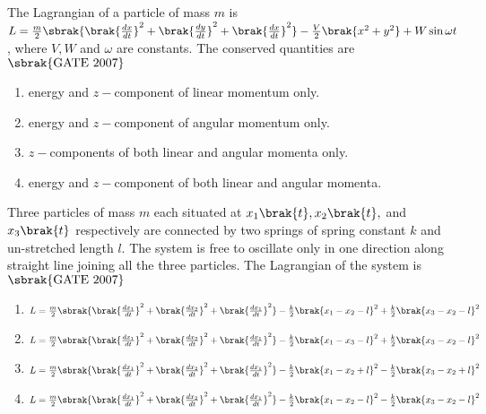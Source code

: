 \iffalse
\section{ph}
\chapter{2007}
\author{ee24btech11017}
\fi

    \item The Lagrangian of a particle of mass $m$ is $L = \frac{m}{2}\sbrak{\brak{\frac{dx}{dt}}^2 +\brak{\frac{dy}{dt}}^2 +\brak{\frac{dx}{dt}}^2}-\frac{V}{2}\brak{x^2+y^2}+W\sin{\omega t}$, where $V,W$ and $\omega$ are constants. The conserved quantities are\hfill{$\sbrak{\text{GATE 2007}}$} \begin{enumerate}
    \item energy and $z-$component of linear momentum only.
    \item energy and $z-$component of angular momentum only. 
    \item $z-$components of both linear and angular momenta only.
    \item energy and $z-$component of both linear and angular momenta.
\end{enumerate}
\item Three particles of mass $m$ each situated at $x_1\brak{t}, x_2\brak{t},$ and $x_3\brak{t}$ respectively are connected by two springs of spring constant $k$ and un-stretched length $l$. The system is free to oscillate only in one direction along straight line joining all the three particles. The Lagrangian of the system is \hfill{$\sbrak{\text{GATE 2007}}$} 
\begin{enumerate}
    \item $L = \frac{m}{2}\sbrak{\brak{\frac{dx_1}{dt}}^2 +\brak{\frac{dx_2}{dt}}^2 +\brak{\frac{dx_1}{dt}}^2}-\frac{k}{2}\brak{x_1-x_2-l}^2 + \frac{k}{2}\brak{x_3 - x_2 - l}^2$
     \item $L = \frac{m}{2}\sbrak{\brak{\frac{dx_1}{dt}}^2 +\brak{\frac{dx_2}{dt}}^2 +\brak{\frac{dx_1}{dt}}^2}-\frac{k}{2}\brak{x_1-x_3-l}^2 + \frac{k}{2}\brak{x_3 - x_2 - l}^2$
      \item $L = \frac{m}{2}\sbrak{\brak{\frac{dx_1}{dt}}^2 +\brak{\frac{dx_2}{dt}}^2 +\brak{\frac{dx_1}{dt}}^2}-\frac{k}{2}\brak{x_1-x_2+l}^2 - \frac{k}{2}\brak{x_3 - x_2 + l}^2$
       \item $L = \frac{m}{2}\sbrak{\brak{\frac{dx_1}{dt}}^2 +\brak{\frac{dx_2}{dt}}^2 +\brak{\frac{dx_1}{dt}}^2}-\frac{k}{2}\brak{x_1-x_2-l}^2 - \frac{k}{2}\brak{x_3 - x_2 - l}^2$
\end{enumerate}
